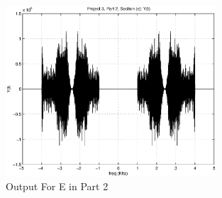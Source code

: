 \begin{figure}[!htbp]
  \centering
    \includegraphics[width=0.7\textwidth]{Part2/Output/Figures/Part2E-7.eps}
  \caption{Output For E in Part 2}
\end{figure}

